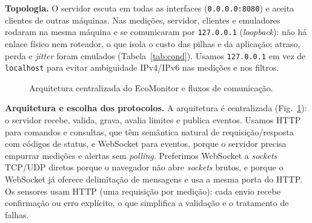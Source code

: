 \documentclass[conference]{IEEEtran}
\begin{document}
\textbf{Topologia.} O servidor escuta em todas as interfaces (\texttt{0.0.0.0:8080}) e aceita clientes de outras máquinas. Nas medições, servidor, clientes e emuladores rodaram na mesma máquina e se comunicaram por \texttt{127.0.0.1} (\emph{loopback}): não há enlace físico nem roteador, o que isola o custo das pilhas e da aplicação; atraso, perda e \emph{jitter} foram emulados (Tabela~\ref{tab:cond}). Usamos \texttt{127.0.0.1} em vez de \texttt{localhost} para evitar ambiguidade IPv4/IPv6 nas medições e nos filtros.

\begin{figure}[t]
\centering
{}
\caption{Arquitetura centralizada do EcoMonitor e fluxos de comunicação.}
\label{fig:arq}
\end{figure}

\textbf{Arquitetura e escolha dos protocolos.} A arquitetura é centralizada (Fig.~\ref{fig:arq}): o servidor recebe, valida, grava, avalia limites e publica eventos. Usamos HTTP para comandos e consultas, que têm semântica natural de requisição/resposta com códigos de status, e WebSocket para eventos, porque o servidor precisa empurrar medições e alertas sem \emph{polling}. Preferimos WebSocket a \emph{sockets} TCP/UDP diretos porque o navegador não abre \emph{sockets} brutos, e porque o WebSocket já oferece delimitação de mensagens e usa a mesma porta do HTTP. Os sensores usam HTTP (uma requisição por medição): cada envio recebe confirmação ou erro explícito, o que simplifica a validação e o tratamento de falhas.
\end{document}
